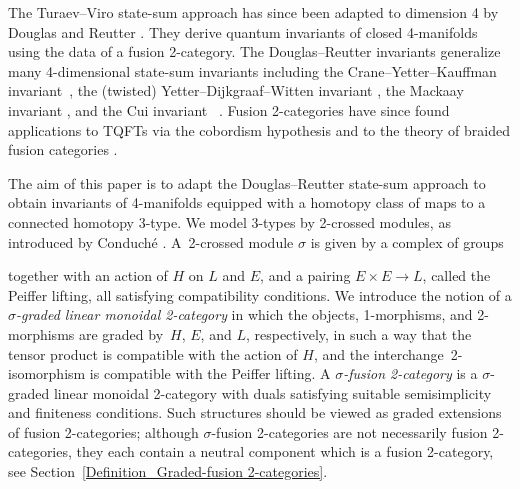 \documentclass[a4paper, oneside]{amsart}
\numberwithin{equation}{subsection}
\theoremstyle{referencedlemma}
\theoremstyle{plain} %
\theoremstyle{remark}
\begin{document}
The Turaev--Viro state-sum approach has since been adapted to dimension 4 by Douglas and Reutter \cite{douglas_fusion_2018}.  They derive quantum invariants of closed 4-manifolds using the data of a fusion 2-category.  The Douglas--Reutter invariants generalize many 4-dimensional state-sum invariants including the Crane--Yetter--Kauffman invariant~\cite{crane_state-sum_1997}, the (twisted) Yetter--Dijkgraaf--Witten invariant \cite{yetter_tqfts_1993, martins_yetters_2007}, the Mackaay invariant \cite{mackaay_spherical_1999}, and the Cui invariant~ \cite{cui_four_2019}. Fusion 2-categories have since found applications to TQFTs via the cobordism hypothesis \cite{decoppet_dualizability_2024, decoppet_drinfeld_2025} and to the theory of braided fusion categories \cite{johnson-freyd_minimal_2023}. 

The aim of this paper is to adapt the Douglas--Reutter state-sum approach to obtain invariants of 4-manifolds equipped with a homotopy class of maps to a connected homotopy 3-type.   We model 3-types by 2-crossed modules, as introduced by Conduché \cite{conduche_modules_1984}.  A~2-crossed module $\sigma$ is given by a complex of groups
\begin{center}
\end{center}
together with an action of $H$ on $L$ and $E$, and a pairing $E\times E \to L$, called the Peiffer lifting, all satisfying compatibility conditions.  We introduce the notion of a \emph{$\sigma$-graded linear monoidal 2-category} in which the objects, \mbox{1-morphisms}, and 2-morphisms are graded by~$H$, $E$, and $L$, respectively, in such a way that the tensor product is compatible with the action of $H$, and the interchange~2-isomorphism is compatible with the Peiffer lifting.  A \emph{$\sigma$-fusion 2-category} is a $\sigma$-graded linear monoidal 2-category with duals satisfying suitable semisimplicity and finiteness conditions.  Such structures should be viewed as graded extensions of fusion 2-categories; although $\sigma$-fusion 2-categories are not necessarily fusion 2-categories, they each contain a neutral component which is a fusion 2-category, see Section~\ref{Definition_Graded-fusion 2-categories}. 
\end{document}
